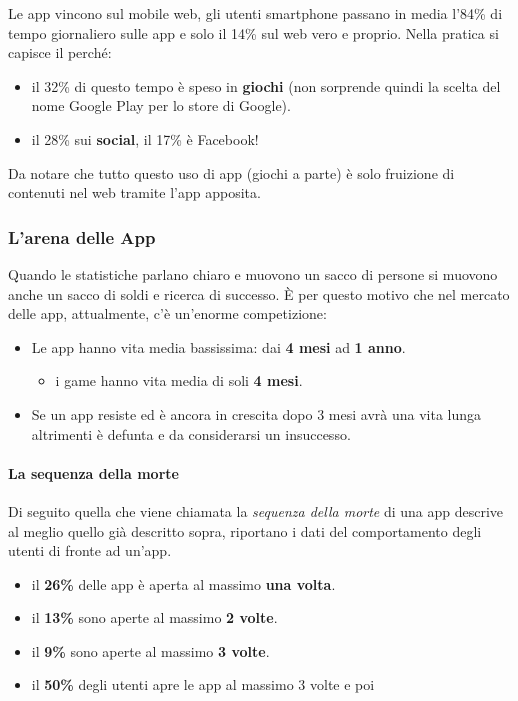 			Le app vincono sul mobile web, gli utenti smartphone passano in media l'84\% di tempo giornaliero sulle app e solo il 14\% sul web vero e proprio. Nella pratica si capisce il perché:
			\begin{itemize}
				\item il 32\% di questo tempo è speso in \textbf{giochi} (non sorprende quindi la scelta del nome Google Play per lo store di Google).
				\item il 28\% sui \textbf{social}, il 17\% è Facebook!
			\end{itemize}
			Da notare che tutto questo uso di app (giochi a parte) è solo fruizione di contenuti nel web tramite l'app apposita.
			
		\subsubsection{L'arena delle App}
			Quando le statistiche parlano chiaro e muovono un sacco di persone si muovono anche un sacco di soldi e ricerca di successo. È per questo motivo che nel mercato delle app, attualmente, c'è un'enorme competizione:
			\begin{itemize}
				\item Le app hanno vita media bassissima: dai \textbf{4 mesi} ad \textbf{1 anno}.
					\begin{itemize}
						\item i game hanno vita media di soli \textbf{4 mesi}.
					\end{itemize}
				\item Se un app resiste ed è ancora in crescita dopo 3 mesi avrà una vita lunga altrimenti è defunta e da considerarsi un insuccesso.
			\end{itemize}
			
			\paragraph{La sequenza della morte}
				Di seguito quella che viene chiamata la \emph{sequenza della morte} di una app descrive al meglio quello già descritto sopra, riportano i dati del comportamento degli utenti di fronte ad un'app.
				\begin{itemize}
					\item il \textbf{26\%} delle app è aperta al massimo \textbf{una volta}.
					\item il \textbf{13\%} sono aperte al massimo \textbf{2 volte}.
					\item il \textbf{9\%} sono aperte al massimo \textbf{3 volte}.
					\item il \textbf{50\%} degli utenti apre le app al massimo 3 volte e poi 
				\end{itemize}
		

